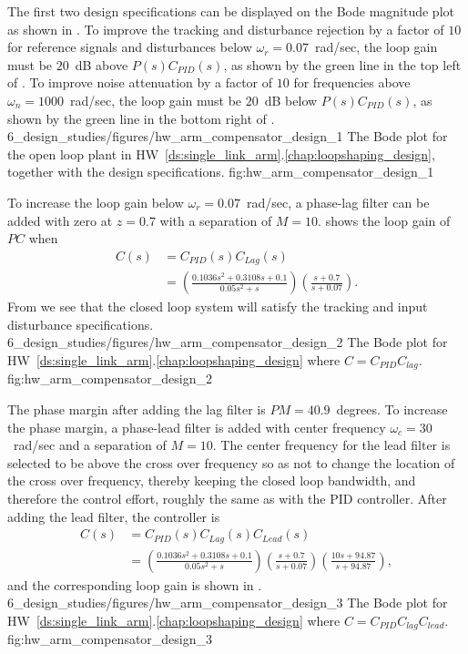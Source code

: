 
The first two design specifications can be displayed on the Bode magnitude plot as shown in .  To improve the tracking and disturbance rejection by a factor of $10$ for reference signals and disturbances below $\omega_r=0.07$~rad/sec, the loop gain must be $20$~dB above $P(s)C_{PID}(s)$, as shown by the green line in the top left of .
%
To improve noise attenuation by a factor of $10$ for frequencies above $\omega_n=1000$~rad/sec, the loop gain must be $20$~dB below $P(s)C_{PID}(s)$, as shown by the green line in the bottom right of .
%
	{6_design_studies/figures/hw_arm_compensator_design_1}
	{The Bode plot for the open loop plant in HW~\ref{ds:single_link_arm}.\ref{chap:loopshaping_design}, together with the design specifications.}
	{fig:hw_arm_compensator_design_1}

To increase the loop gain below $\omega_r=0.07$~rad/sec, a phase-lag filter can be added with zero at $z=0.7$ with a separation of $M=10$.   shows the loop gain of $PC$ when 
\begin{align*}
C(s) &= C_{PID}(s)C_{Lag}(s) \\
     &=  \left(\frac{0.1036 s^2 + 0.3108 s + 0.1}{0.05 s^2 + s}\right)\left(\frac{s + 0.7}{s + 0.07}\right).
\end{align*}
From  we see that the closed loop system will satisfy the tracking and input disturbance specifications. 
	{6_design_studies/figures/hw_arm_compensator_design_2}
	{The Bode plot for HW~\ref{ds:single_link_arm}.\ref{chap:loopshaping_design} where $C=C_{PID}C_{lag}$.}
	{fig:hw_arm_compensator_design_2}

The phase margin after adding the lag filter is $PM=40.9$~degrees.  To increase the phase margin, a phase-lead filter is added with center frequency $\omega_c=30$~rad/sec and a separation of $M=10$.  The center frequency for the lead filter is selected to be above the cross over frequency so as not to change the location of the cross over frequency, thereby keeping the closed loop bandwidth, and therefore the control effort, roughly the same as with the PID controller.  After adding the lead filter, the controller is
\begin{align*}
C(s) &= C_{PID}(s)C_{Lag}(s)C_{Lead}(s) \\
     &=  \left(\frac{0.1036 s^2 + 0.3108 s + 0.1}{0.05 s^2 + s}\right)\left(\frac{s + 0.7}{s + 0.07}\right)
	\left(\frac{10 s + 94.87}{s + 94.87}\right),
\end{align*}
and the corresponding loop gain is shown in .
	{6_design_studies/figures/hw_arm_compensator_design_3}
	{The Bode plot for HW~\ref{ds:single_link_arm}.\ref{chap:loopshaping_design} where $C=C_{PID}C_{lag}C_{lead}$.}
	{fig:hw_arm_compensator_design_3}

